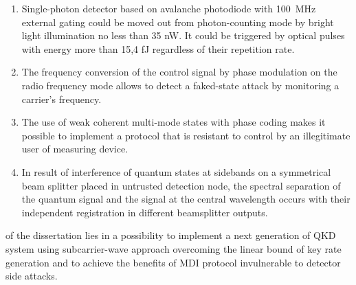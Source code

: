 {\statements}
\begin{enumerate}

  \item Single-photon detector based on avalanche photodiode with 100~MHz external gating could be moved out from photon-counting mode by bright light illumination no less than 35 nW. It could be triggered by optical pulses with energy more than 15,4 fJ regardless of their repetition rate.
  \item The frequency conversion of the control signal by phase modulation on the radio frequency mode allows to detect a faked-state attack by monitoring a carrier's frequency.
  \item The use of weak coherent multi-mode states with phase coding makes it possible to implement a protocol that is resistant to control by an illegitimate user of measuring device.
  \item In result of interference of quantum states at sidebands on a symmetrical beam splitter placed in untrusted detection node, the spectral separation of the quantum signal and the signal at the central wavelength occurs with their independent registration in different beamsplitter outputs. 
 
\end{enumerate}

{\importance} of the dissertation lies in a possibility to implement a next generation of QKD system using subcarrier-wave approach overcoming the linear bound of key rate generation and to achieve the benefits of MDI protocol invulnerable to detector side attacks.


